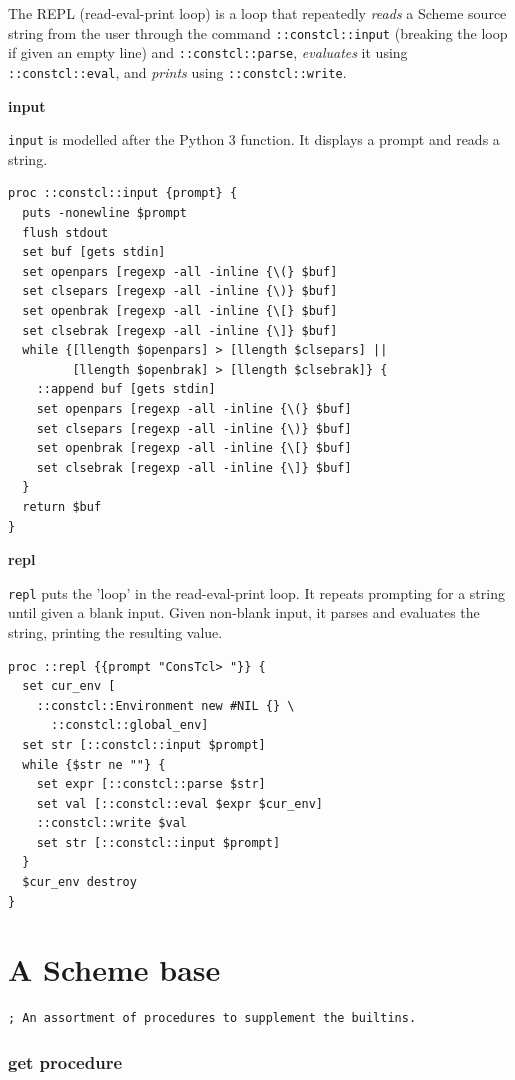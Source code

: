 \documentclass[twoside,9pt]{report}
\begin{document}
The REPL (read-eval-print loop) is a loop that repeatedly \emph{reads} a Scheme source string from the user through the command \texttt{::constcl::input} (breaking the loop if given an empty line) and \texttt{::constcl::parse}, \emph{evaluates} it using \texttt{::constcl::eval}, and \emph{prints} using \texttt{::constcl::write}.



\textbf{input}


\texttt{input} is modelled after the Python 3 function. It displays a prompt and reads a string.

\begin{lstlisting}
proc ::constcl::input {prompt} {
  puts -nonewline $prompt
  flush stdout
  set buf [gets stdin]
  set openpars [regexp -all -inline {\(} $buf]
  set clsepars [regexp -all -inline {\)} $buf]
  set openbrak [regexp -all -inline {\[} $buf]
  set clsebrak [regexp -all -inline {\]} $buf]
  while {[llength $openpars] > [llength $clsepars] ||
         [llength $openbrak] > [llength $clsebrak]} {
    ::append buf [gets stdin]
    set openpars [regexp -all -inline {\(} $buf]
    set clsepars [regexp -all -inline {\)} $buf]
    set openbrak [regexp -all -inline {\[} $buf]
    set clsebrak [regexp -all -inline {\]} $buf]
  }
  return $buf
}
\end{lstlisting}


\textbf{repl}


\texttt{repl} puts the 'loop' in the read-eval-print loop. It repeats prompting for a string until given a blank input. Given non-blank input, it parses and evaluates the string, printing the resulting value.

\begin{lstlisting}
proc ::repl {{prompt "ConsTcl> "}} {
  set cur_env [
    ::constcl::Environment new #NIL {} \
      ::constcl::global_env]
  set str [::constcl::input $prompt]
  while {$str ne ""} {
    set expr [::constcl::parse $str]
    set val [::constcl::eval $expr $cur_env]
    ::constcl::write $val
    set str [::constcl::input $prompt]
  }
  $cur_env destroy
}
\end{lstlisting}
\chapter{A Scheme base}
\label{a-scheme-base}
\begin{lstlisting}
; An assortment of procedures to supplement the builtins.
\end{lstlisting}
\subsection{get procedure}
\label{get-procedure}
\end{document}
